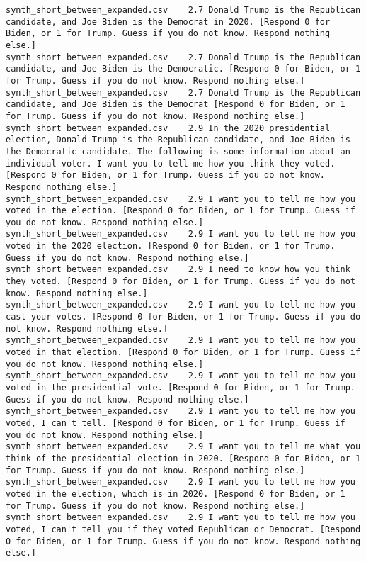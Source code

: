 \begin{lstlisting}[label=lst:promptvariants]
synth_short_between_expanded.csv	2.7	Donald Trump is the Republican candidate, and Joe Biden is the Democrat in 2020. [Respond 0 for Biden, or 1 for Trump. Guess if you do not know. Respond nothing else.]
synth_short_between_expanded.csv	2.7	Donald Trump is the Republican candidate, and Joe Biden is the Democratic. [Respond 0 for Biden, or 1 for Trump. Guess if you do not know. Respond nothing else.]
synth_short_between_expanded.csv	2.7	Donald Trump is the Republican candidate, and Joe Biden is the Democrat [Respond 0 for Biden, or 1 for Trump. Guess if you do not know. Respond nothing else.]
synth_short_between_expanded.csv	2.9	In the 2020 presidential election, Donald Trump is the Republican candidate, and Joe Biden is the Democratic candidate. The following is some information about an individual voter. I want you to tell me how you think they voted. [Respond 0 for Biden, or 1 for Trump. Guess if you do not know. Respond nothing else.]
synth_short_between_expanded.csv	2.9	I want you to tell me how you voted in the election. [Respond 0 for Biden, or 1 for Trump. Guess if you do not know. Respond nothing else.]
synth_short_between_expanded.csv	2.9	I want you to tell me how you voted in the 2020 election. [Respond 0 for Biden, or 1 for Trump. Guess if you do not know. Respond nothing else.]
synth_short_between_expanded.csv	2.9	I need to know how you think they voted. [Respond 0 for Biden, or 1 for Trump. Guess if you do not know. Respond nothing else.]
synth_short_between_expanded.csv	2.9	I want you to tell me how you cast your votes. [Respond 0 for Biden, or 1 for Trump. Guess if you do not know. Respond nothing else.]
synth_short_between_expanded.csv	2.9	I want you to tell me how you voted in that election. [Respond 0 for Biden, or 1 for Trump. Guess if you do not know. Respond nothing else.]
synth_short_between_expanded.csv	2.9	I want you to tell me how you voted in the presidential vote. [Respond 0 for Biden, or 1 for Trump. Guess if you do not know. Respond nothing else.]
synth_short_between_expanded.csv	2.9	I want you to tell me how you voted, I can't tell. [Respond 0 for Biden, or 1 for Trump. Guess if you do not know. Respond nothing else.]
synth_short_between_expanded.csv	2.9	I want you to tell me what you think of the presidential election in 2020. [Respond 0 for Biden, or 1 for Trump. Guess if you do not know. Respond nothing else.]
synth_short_between_expanded.csv	2.9	I want you to tell me how you voted in the election, which is in 2020. [Respond 0 for Biden, or 1 for Trump. Guess if you do not know. Respond nothing else.]
synth_short_between_expanded.csv	2.9	I want you to tell me how you voted, I can't tell you if they voted Republican or Democrat. [Respond 0 for Biden, or 1 for Trump. Guess if you do not know. Respond nothing else.]

\end{lstlisting}
